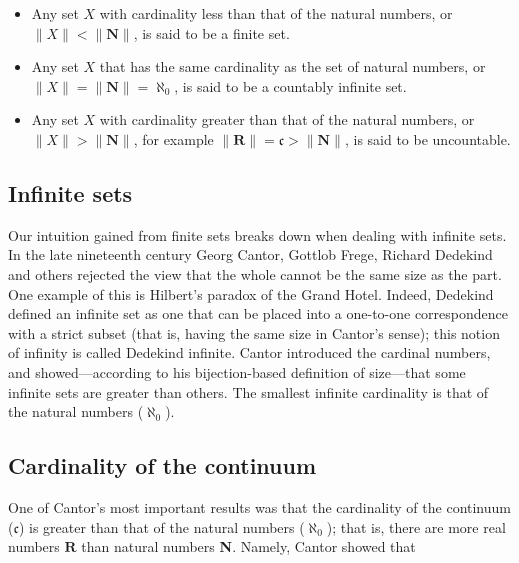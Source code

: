\begin{itemize}
    \item Any set $X$ with cardinality less than that of the natural numbers, or $\|X\| < \|\mathbf{N}\|$, is said to be a finite set.
    \item Any set $X$ that has the same cardinality as the set of natural numbers, or $\|X\| = \|\mathbf{N}\| = \aleph _0$, is said to be a countably infinite set.
    \item Any set $X$ with cardinality greater than that of the natural numbers, or $\|X\| > \|\mathbf{N}\|$, for example $\|\mathbf{R}\| = \mathfrak{c} > \|\mathbf{N}\|$, is said to be uncountable.
\end{itemize}


\subsection{Infinite sets}
\label{sss:infi-e517}




Our intuition gained from finite sets breaks down when dealing with infinite sets. In the
late nineteenth century Georg Cantor, Gottlob Frege, Richard Dedekind and others rejected
the view that the whole cannot be the same size as the part. One example of this is
Hilbert's paradox of the Grand Hotel. Indeed, Dedekind defined an infinite set as one that
can be placed into a one-to-one correspondence with a strict subset (that is, having the
same size in Cantor's sense); this notion of infinity is called Dedekind infinite. Cantor
introduced the cardinal numbers, and showed—according to his bijection-based definition of
size—that some infinite sets are greater than others. The smallest infinite cardinality is
that of the natural numbers ($\aleph _0$).




\subsection{Cardinality of the continuum}
\label{sss:card-60d1}




One of Cantor's most important results was that the cardinality of the continuum
($\mathfrak{c}$) is greater than that of the natural numbers ($\aleph _0$); that is, there
are more real numbers $\mathbf{R}$ than natural numbers \textbf{N}. Namely, Cantor showed
that

